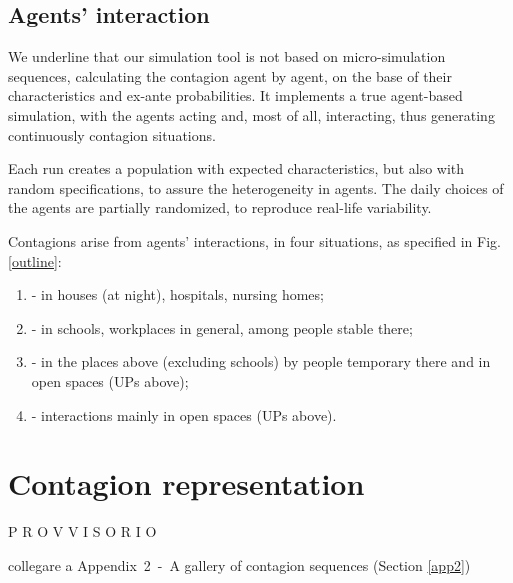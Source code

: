 \documentclass[graybox]{svmult}
\begin{document}
\subsection{Agents' interaction}
\label{inter}

We underline that our simulation tool is not based on micro-simulation sequences, calculating the contagion agent by agent, on the base of their characteristics and ex-ante probabilities. It implements a true agent-based simulation, with the agents acting and, most of all, interacting, thus generating continuously contagion situations.

Each run creates a population with expected characteristics, but also with random specifications, to assure the heterogeneity in agents. The daily choices of the agents are partially randomized, to reproduce real-life variability.

Contagions arise from agents' interactions, in four situations, as specified in Fig. \ref{outline}:

\begin{enumerate}[label=\Alph*]

\item - in houses (at night), hospitals, nursing homes;

\item - in schools, workplaces in general, among people stable there;

\item - in the places above (excluding schools) by people temporary there and in open spaces (UPs above);

\item - interactions mainly in open spaces (UPs above).

\end{enumerate}

\section{Contagion representation}

P R O V V I S O R I O

collegare a Appendix~2~-~A gallery of contagion sequences (Section \ref{app2})
\end{document}
